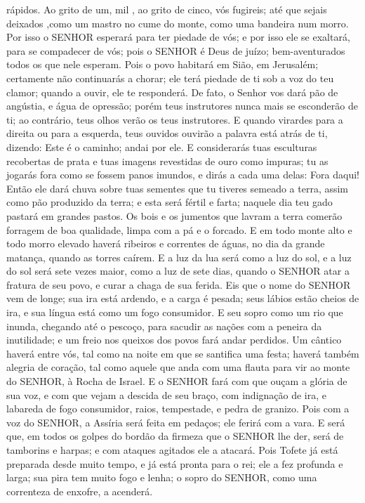{{} rápidos.
Ao grito de um, mil
{} ,{} ao grito de cinco,
{} vós fugireis; até que sejais deixados
{} ,como um mastro no cume do monte, como uma bandeira num morro.
Por isso o SENHOR esperará para ter piedade de vós; e por isso ele se exaltará, para se compadecer de vós; pois o SENHOR é Deus de juízo; bem-aventurados todos os que nele esperam.
Pois o povo habitará em Sião, em Jerusalém; certamente não continuarás a chorar; ele terá piedade de ti sob a voz do teu clamor; quando a ouvir, ele te responderá.
De fato, o Senhor vos dará pão de angústia, e água de opressão; porém teus instrutores
 nunca mais se esconderão de ti; ao contrário, teus olhos verão os teus instrutores.
E quando virardes para a direita ou para a esquerda, teus ouvidos ouvirão a palavra
{} está atrás de ti, dizendo: Este é o caminho; andai por ele.
E considerarás tuas esculturas recobertas de prata e tuas imagens revestidas de ouro como impuras; tu as jogarás fora como se fossem panos imundos, e dirás a cada uma delas: Fora daqui!
Então ele dará chuva sobre tuas sementes que tu tiveres semeado a terra, assim como pão produzido da terra; e esta será fértil e farta; naquele dia teu gado pastará em grandes pastos.
Os bois e os jumentos que lavram a terra comerão forragem de boa qualidade, limpa com a pá e o forcado.
E em todo monte alto e todo morro elevado haverá ribeiros e correntes de águas, no dia da grande matança, quando as torres caírem.
E a luz da lua será como a luz do sol, e a luz do sol será sete vezes maior, como a luz de sete dias, quando o SENHOR atar a fratura de seu povo, e curar a chaga de sua ferida.
Eis que o nome do SENHOR vem de longe; sua ira está ardendo, e a carga é pesada; seus lábios estão cheios de ira, e sua língua está como um fogo consumidor.
E seu sopro como um rio que inunda, chegando até o pescoço, para sacudir as nações com a peneira da inutilidade; e um freio nos queixos dos povos
{} fará andar perdidos.
Um cântico haverá entre vós, tal como na noite em que se santifica uma festa; haverá também alegria de coração, tal como aquele que anda com uma flauta para vir ao monte do SENHOR, à Rocha de Israel.
E o SENHOR fará com que ouçam a glória de sua voz, e com que vejam a descida de seu braço, com indignação de ira, e labareda de fogo consumidor, raios, tempestade, e pedra de granizo.
Pois com a voz do SENHOR, a Assíria será feita em pedaços; ele
{} ferirá com a vara.
E será que, em todos os golpes
 do bordão da firmeza
 que o SENHOR lhe der, será
{} de tamborins e harpas; e com ataques agitados ele a atacará.
Pois Tofete já está preparada desde muito tempo, e já está pronta para o rei; ele a fez profunda e larga; sua pira tem muito fogo e lenha; o sopro do SENHOR, como uma correnteza de enxofre, a acenderá.

}
